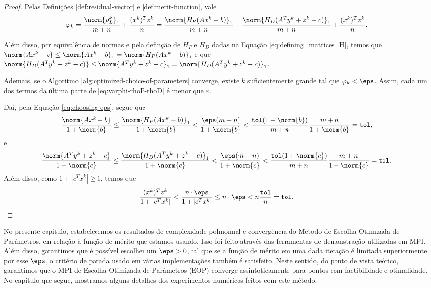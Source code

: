 \begin{proof}
	 Pelas Definições \ref{def:residual-vector} e \ref{def:merit-function}, vale
	\begin{equation}
		\label{eq:varphi-rhoP-rhoD}
				\varphi_{k} =  \frac{\norm{\rho^{k}_L}_1}{m+n} + 
\frac{(x^{k})^Tz^{k}}{n}  = \frac{\norm{H_{P}(Ax^{k} - b)}_1}{m+n} +\frac{\norm{H_{D}(A^{T}y^{k} + z^{k}- c)}_1 }{m+n} + 
\frac{(x^{k})^Tz^{k}}{n}.
	\end{equation}

Além disso, por equivalência de normas e pela definção de $H_{P}$ e $H_{D}$ dadas na Equação \eqref{eq:defining_matrices_H}, temos que $\norm{Ax^{k} - b} \leq \norm{Ax^{k} - b}_{1} = \norm{H_{P}(Ax^{k} - b)}_{1}$ e que $\norm{H_{D}(A^{T}y^{k} + z^{k}- c)} \leq \norm{A^{T}y^{k} + z^{k}- c}_1 = \norm{H_{D}(A^{T}y^{k} + z^{k}- c)}_1$.

Ademais, se  o Algoritmo \ref{alg:optimized-choice-of-parameters} converge, existe $k$ suficientemente grande tal que $\varphi_{k}<\eps$. Assim, cada um dos termos da última parte de \eqref{eq:varphi-rhoP-rhoD} é menor que $\varepsilon$.


Daí, pela Equação \eqref{eq:choosing-eps}, segue que 
\[
\dfrac{\norm{Ax^{k} - b}}{1 + \norm{b}} \leq  \frac{\norm{H_{P}(Ax^{k} - b)}_1  }{1 + \norm{b}} < \frac{\eps (m+n)}{1 + \norm{b}} <\frac{\tol(1+\norm{b})}{m+n} \frac{m+n}{1 + \norm{b}} = \tol,
\]
e
\[
\dfrac{\norm{A^{T}y^{k} + z^{k}- c}}{1 + \norm{c}} \leq  \frac{\norm{H_{D}(A^{T}y^{k} + z^{k}- c)}_{1}  }{1 + \norm{c}} < \frac{\eps (m+n)}{1 + \norm{c}} <\frac{\tol(1+\norm{c})}{m+n} \frac{m+n}{1 + \norm{c}} = \tol.
\]
Além disso, como $1+ |c^{T}x^{k}| \geq 1$, temos que 
\[
\dfrac{(x^{k})^{T}z^{k}}{1+ |c^{T}x^{k}|} <   \frac{n\cdot  \eps}{1+ |c^{T}x^{k}|} \leq n \cdot \eps < n \frac{\tol}{n} = \tol. \qedhere
\]
 \end{proof}

No presente capítulo, estabelecemos os resultados de complexidade polinomial e convergência  do Método de Escolha Otimizada de Parâmetros, em relação à função de mérito que estamos usando. Isso foi feito através das ferramentas de demonstração utilizadas em \acl{MPI}. Além disso, garantimos que é possível escolher um $\eps>0$, tal que se a função de mérito em uma dada iteração é limitada superiormente por esse $\eps$, o critério de parada  usado em várias implementações também é satisfeito. Neste sentido, do ponto de vista teórico,  garantimos que o \ac{MPI} de Escolha Otimizada de Parâmetros (EOP) converge assintoticamente para pontos com factibilidade e otimalidade. No capítulo que segue, mostramos alguns detalhes dos experimentos numéricos feitos com este método.


